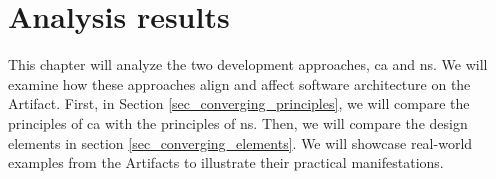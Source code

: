 \chapter{Analysis results} \label{chap_evaluation}

This chapter will analyze the two development approaches, \gls{ca} and \gls{ns}. We will
examine how these approaches align and affect software architecture on the Artifact.
First, in Section \ref{sec_converging_principles}, we will compare the principles of
\gls{ca} with the principles of \gls{ns}. Then, we will compare the design elements in
section \ref{sec_converging_elements}. We will showcase real-world examples from the
Artifacts to illustrate their practical manifestations.








